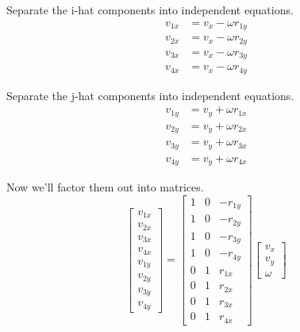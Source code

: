Separate the i-hat components into independent equations.
\begin{align*}
  v_{1x} &= v_x - \omega r_{1y} \\
  v_{2x} &= v_x - \omega r_{2y} \\
  v_{3x} &= v_x - \omega r_{3y} \\
  v_{4x} &= v_x - \omega r_{4y}
\end{align*}

Separate the j-hat components into independent equations.
\begin{align*}
  v_{1y} &= v_y + \omega r_{1x} \\
  v_{2y} &= v_y + \omega r_{2x} \\
  v_{3y} &= v_y + \omega r_{3x} \\
  v_{4y} &= v_y + \omega r_{4x}
\end{align*}

Now we'll factor them out into matrices.
\begin{equation*}
  \begin{bmatrix}
    v_{1x} \\
    v_{2x} \\
    v_{3x} \\
    v_{4x} \\
    v_{1y} \\
    v_{2y} \\
    v_{3y} \\
    v_{4y}
  \end{bmatrix} =
  \begin{bmatrix}
    1 & 0 & -r_{1y} \\
    1 & 0 & -r_{2y} \\
    1 & 0 & -r_{3y} \\
    1 & 0 & -r_{4y} \\
    0 & 1 &  r_{1x} \\
    0 & 1 &  r_{2x} \\
    0 & 1 &  r_{3x} \\
    0 & 1 &  r_{4x}
  \end{bmatrix}
  \begin{bmatrix}
    v_x \\
    v_y \\
    \omega
  \end{bmatrix}
\end{equation*}

